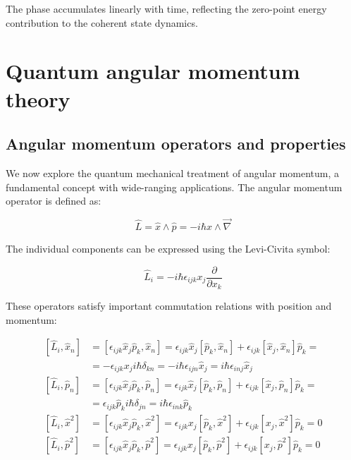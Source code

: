 \documentclass[italian]{HKNdocument}
\begin{document}
The phase accumulates linearly with time, reflecting the zero-point energy contribution to the coherent state dynamics.

\section{Quantum angular momentum theory}
\subsection{Angular momentum operators and properties}
We now explore the quantum mechanical treatment of angular momentum, a fundamental concept with wide-ranging applications. The angular momentum operator is defined as:

\begin{equation}
\hat{L}=\hat{x} \wedge \hat{p}=-i \hbar x \wedge \vec{\nabla} \label{eq:8.1}
\end{equation}

The individual components can be expressed using the Levi-Civita symbol:

\begin{equation}
\hat{L}_{i}=-i \hbar \epsilon_{i j k} x_{j} \frac{\partial}{\partial x_{k}} \label{eq:8.2}
\end{equation}

These operators satisfy important commutation relations with position and momentum:

\begin{align}
{\left[\hat{L}_{i}, \hat{x}_{n}\right] } & =\left[\epsilon_{i j k} \hat{x}_{j} \hat{p}_{k}, \hat{x}_{n}\right]=\epsilon_{i j k} \hat{x}_{j}\left[\hat{p}_{k}, \hat{x}_{n}\right]+\epsilon_{i j k}\left[\hat{x}_{j}, \hat{x}_{n}\right] \hat{p}_{k}= \\
& =-\epsilon_{i j k} x_{j} i \hbar \delta_{k n}=-i \hbar \epsilon_{i j n} \hat{x}_{j}=i \hbar \epsilon_{i n j} \hat{x}_{j}  \label{eq:8.3}\\
{\left[\hat{L}_{i}, \hat{p}_{n}\right] } & =\left[\epsilon_{i j k} \hat{x}_{j} \hat{p}_{k}, \hat{p}_{n}\right]=\epsilon_{i j k} \hat{x}_{j}\left[\hat{p}_{k}, \hat{p}_{n}\right]+\epsilon_{i j k}\left[\hat{x}_{j}, \hat{p}_{n}\right] \hat{p}_{k}= \\
& =\epsilon_{i j k} \hat{p}_{k} i \hbar \delta_{j n}=i \hbar \epsilon_{i n k} \hat{p}_{k}  \label{eq:8.4}\\
{\left[\hat{L}_{i}, \hat{x}^{2}\right] } & =\left[\epsilon_{i j k} \hat{x}_{j} \hat{p}_{k}, \hat{x}^{2}\right]=\epsilon_{i j k} x_{j}\left[\hat{p}_{k}, \hat{x}^{2}\right]+\epsilon_{i j k}\left[x_{j}, \hat{x}^{2}\right] \hat{p}_{k}=0  \label{eq:8.5}\\
{\left[\hat{L}_{i}, \hat{p}^{2}\right] } & =\left[\epsilon_{i j k} \hat{x}_{j} \hat{p}_{k}, \hat{p}^{2}\right]=\epsilon_{i j k} x_{j}\left[\hat{p}_{k}, \hat{p}^{2}\right]+\epsilon_{i j k}\left[x_{j}, \hat{p}^{2}\right] \hat{p}_{k}=0 \label{eq:8.6}
\end{align}
\end{document}
